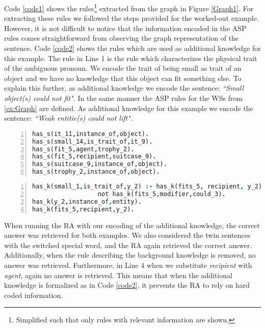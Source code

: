 Code \ref{code1} shows the rules\footnote{Simplified such that only rules with relevant information are shown.} extracted from the graph in Figure \ref{Graph1}. For extracting these rules we followed the steps provided for the worked-out example. However, it is not difficult to notice that the information encoded in the ASP rules comes straightforward from observing the graph representation of the sentence.
Code \ref{code2} shows the rules which are used as additional knowledge for this example. The rule in Line 1 is the rule which characterizes the physical trait of the ambiguous pronoun. We encode the trait of being small as trait of an object and we have no knowledge that this object can fit something else. To explain this further, as additional knowledge we encode the sentence: \textit{``Small object(s) could not fit"}.
In the same manner the ASP rules for the WSs from \ref{ex:Graph} are defined. As additional knowledge for this example we encode the sentence: \textit{``Weak entitie(s) could not lift"}. 

\begin{lstlisting}[language = Prolog,  caption={Knowledge from S2},label=code1, numbers=left,
numberstyle=\tiny] 
has_s(it_11,instance_of,object).
has_s(small_14,is_trait_of,it_9).
has_s(fit_5,agent,trophy_2).
has_s(fit_5,recipient,suitcase_9).
has_s(suitcase_9,instance_of,object).
has_s(trophy_2,instance_of,object).
\end{lstlisting}

\begin{lstlisting}[language = Prolog,  caption={Additional knowledge},label=code2,numbers=left,
numberstyle=\tiny]
has_k(small_1,is_trait_of,y_2) :- has_k(fits_5, recipient, y_2), 
				  not has_k(fits_5,modifier,could_3).
has_k(y_2,instance_of,entity).
has_k(fits_5,recipient,y_2).
\end{lstlisting}

When running the RA with our encoding of the additional knowledge, the correct answer was retrieved for both examples. We also considered the twin sentences with the switched special word, and the RA again retrieved the correct answer. Additionally, when the rule describing the background knowledge is removed, no answer was retrieved. Furthermore, in Line 4 when we substitute \textit{recipient} with \textit{agent}, again no answer is retrieved. This means that when the additional knowledge is formalized as in Code \ref{code2}, it prevents the RA to rely on hard coded information.









